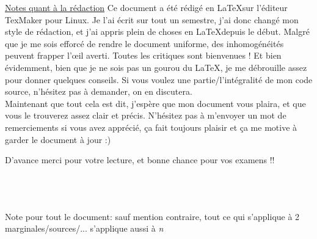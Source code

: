 \documentclass[11pt,a4paper]{article}
\renewcommand{\)}{\right)}
\renewcommand{\(}{\left(}
\begin{document}
\uline{Notes quant à la rédaction}
Ce document a été rédigé en \LaTeX sur l'éditeur TexMaker pour Linux. Je l'ai écrit sur tout un semestre, j'ai donc changé mon style de rédaction, et j'ai appris plein de choses en \LaTeX depuis le début. Malgré que je me sois efforcé de rendre le document uniforme, des inhomogénéités peuvent frapper l'\oe il averti. Toutes les critiques sont bienvenues ! Et bien évidemment, bien que je ne sois pas un gourou du \LaTeX, je me débrouille assez pour donner quelques conseils. Si vous voulez une partie/l'intégralité de mon code source, n'hésitez pas à demander, on en discutera.\\


Maintenant que tout cela est dit, j'espère que mon document vous plaira, et que vous le trouverez assez clair et précis. N'hésitez pas à m'envoyer un mot de remerciements si vous avez apprécié, ça fait toujours plaisir et ça me motive à garder le document à jour :)

D'avance merci pour votre lecture, et bonne chance pour vos examens !!\\
\\
\\
\\
\begin{boite}
	Note pour tout le document: sauf mention contraire, tout ce qui s'applique à 2 marginales/sources/... s'applique aussi à \textit{n}
\end{boite}
\end{document}

